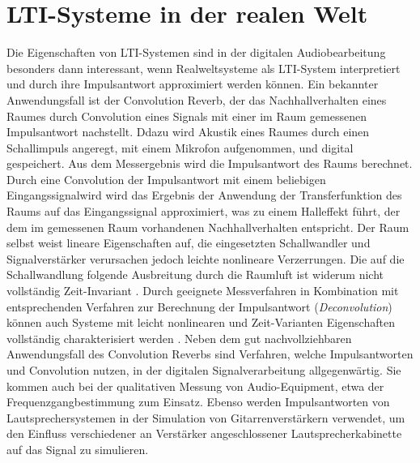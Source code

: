 \section{LTI-Systeme in der realen Welt}
\label{sec:irl_lti}
Die Eigenschaften von LTI-Systemen sind in der digitalen Audiobearbeitung besonders dann interessant, wenn Realweltsysteme als LTI-System interpretiert
und durch ihre Impulsantwort approximiert werden können.
Ein bekannter Anwendungsfall ist der Convolution Reverb, der das Nachhallverhalten eines Raumes durch Convolution eines Signals mit einer im Raum
gemessenen Impulsantwort nachstellt. Ddazu wird Akustik eines Raumes durch einen Schallimpuls angeregt, mit einem Mikrofon aufgenommen, und digital gespeichert. 
Aus dem Messergebnis wird die Impulsantwort des Raums berechnet.
Durch eine Convolution der Impulsantwort mit einem beliebigen Eingangssignalwird wird das Ergebnis der Anwendung der Transferfunktion des Raums
auf das Eingangssignal approximiert, was zu einem Halleffekt führt, der dem im gemessenen Raum vorhandenen Nachhallverhalten entspricht.
Der Raum selbst weist lineare Eigenschaften auf, die eingesetzten Schallwandler und
Signalverstärker verursachen jedoch leichte nonlineare Verzerrungen. Die auf die Schallwandlung folgende Ausbreitung durch 
die Raumluft ist widerum nicht vollständig Zeit-Invariant \cite{farina2000,farina2007a,prawda2024}. 
Durch geeignete Messverfahren in Kombination mit entsprechenden Verfahren zur Berechnung der Impulsantwort (\textit{Deconvolution}) können auch Systeme mit leicht
nonlinearen und Zeit-Varianten Eigenschaften vollständig charakterisiert werden \cite{farina2000,farina2007a}. 
Neben dem gut nachvollziehbaren Anwendungsfall des Convolution Reverbs sind Verfahren, welche Impulsantworten und Convolution nutzen, in der
digitalen Signalverarbeitung allgegenwärtig. Sie kommen auch bei der qualitativen Messung von Audio-Equipment, etwa der Frequenzgangbestimmung
zum Einsatz. Ebenso werden Impulsantworten von Lautsprechersystemen in der Simulation von Gitarrenverstärkern verwendet, um den Einfluss
verschiedener an Verstärker angeschlossener Lautsprecherkabinette auf das Signal zu simulieren. 
